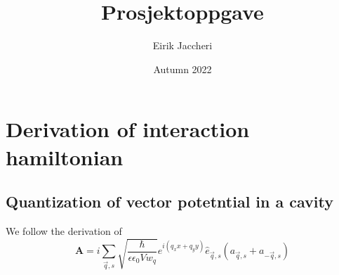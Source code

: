 \documentclass{article}
\title{Prosjektoppgave}
\author{Eirik Jaccheri}
\date{Autumn 2022}
\begin{document}
\maketitle

\section{Derivation of interaction hamiltonian}

\subsection{Quantization of vector potetntial in a cavity}
We follow the derivation of \cite{QuantizationEMCavities}
\begin{equation}
    \textbf{A} = i \sum_{\vec{q},s} \sqrt{\frac{\hbar}{\epsilon \epsilon_0 V w_q}} e^{i(q_x x + q_y y )} \hat{e}_{\vec{q},s}\left(a_{\vec{q},s} + a_{-\vec{q}, s}\right)
    \label{vector potential cavity}
\end{equation}
\end{document}
